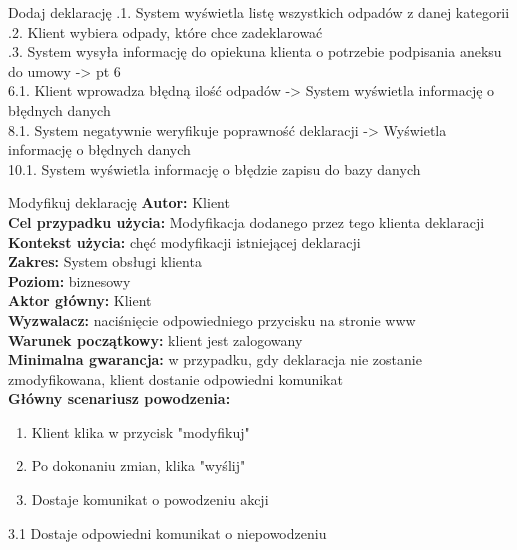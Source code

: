 \begin{usecase}{Dodaj deklarację}
			.1. System wyświetla listę wszystkich odpadów z danej kategorii \\
			.2. Klient wybiera odpady, które chce zadeklarować \\
			.3. System wysyła informację do opiekuna klienta o potrzebie podpisania aneksu do umowy -> pt 6 \\
		6.1. Klient wprowadza błędną ilość odpadów -> System wyświetla informację o błędnych danych \\
		8.1. System negatywnie weryfikuje poprawność deklaracji -> Wyświetla informację o błędnych danych \\
		10.1. System wyświetla informację o błędzie zapisu do bazy danych \\
\end{usecase}

\begin{usecase}{Modyfikuj deklarację}
	\textbf{Autor:} Klient\\
	\textbf{Cel przypadku użycia:} Modyfikacja dodanego przez tego klienta deklaracji \\
	\textbf{Kontekst użycia:} chęć modyfikacji istniejącej deklaracji\\
	\textbf{Zakres:} System obsługi klienta \\
	\textbf{Poziom:} biznesowy \\
	\textbf{Aktor główny:} Klient\\
	\textbf{Wyzwalacz:} naciśnięcie odpowiedniego przycisku na stronie www \\
	\textbf{Warunek początkowy:} klient jest zalogowany\\
	\textbf{Minimalna gwarancja:} w przypadku, gdy deklaracja nie zostanie zmodyfikowana, klient dostanie odpowiedni komunikat \\
	\textbf{Główny scenariusz powodzenia:} \\
		\begin{enumerate}
			\item Klient klika w przycisk "modyfikuj"
			\item Po dokonaniu zmian, klika "wyślij"
			\item Dostaje komunikat o powodzeniu akcji
		\end{enumerate}
			3.1 Dostaje odpowiedni komunikat o niepowodzeniu
\end{usecase}

